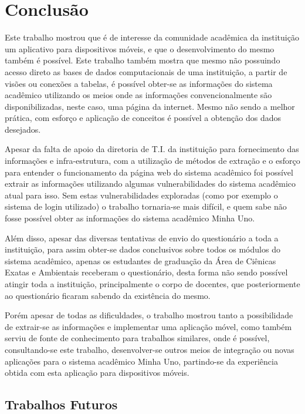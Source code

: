 \chapter{Conclusão}

Este trabalho mostrou que é de interesse da comunidade acadêmica da instituição um aplicativo para dispositivos móveis, e que o desenvolvimento do mesmo também é possível. Este trabalho também mostra que mesmo não possuindo acesso direto as bases de dados computacionais de uma instituição, a partir de visões ou conexões a tabelas, é possível obter-se as informações do sistema acadêmico utilizando os meios onde as informações convencionalmente são disponibilizadas, neste caso, uma página da internet. Mesmo não sendo a melhor prática, com esforço e aplicação de conceitos é possível a obtenção dos dados desejados.

Apesar da falta de apoio da diretoria de T.I. da instituição para fornecimento das informações e infra-estrutura, com a utilização de métodos de extração e o esforço para entender o funcionamento da página web do sistema acadêmico foi possível extrair as informações utilizando algumas vulnerabilidades do sistema acadêmico atual para isso. Sem estas vulnerabilidades exploradas (como por exemplo o sistema de login utilizado) o trabalho tornaria-se mais difícil, e quem sabe não fosse possível obter as informações do sistema acadêmico Minha Uno.

Além disso, apesar das diversas tentativas de envio do questionário a toda a instituição, para assim obter-se dados conclusivos sobre todos os módulos do sistema acadêmico, apenas os estudantes de graduação da Área de Ciênicas Exatas e Ambientais receberam o questionário, desta forma não sendo possível atingir toda a instituição, principalmente o corpo de docentes, que posteriormente ao questionário ficaram sabendo da existência do mesmo.

Porém apesar de todas as dificuldades, o trabalho mostrou tanto a possibilidade de extrair-se as informações e implementar uma aplicação móvel, como também serviu de fonte de conhecimento para trabalhos similares, onde é possível, consultando-se este trabalho, desenvolver-se outros meios de integração ou novas aplicações para o sistema acadêmico Minha Uno, partindo-se da experiência obtida com esta aplicação para dispositivos móveis.

\section{Trabalhos Futuros}

